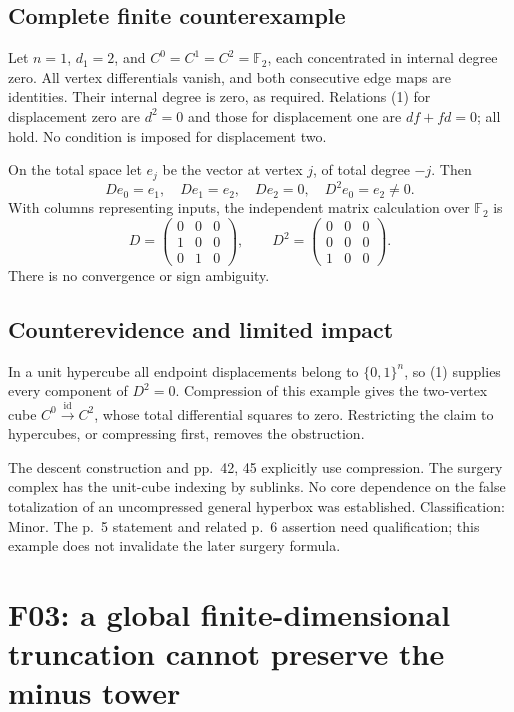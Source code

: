 \documentclass[10pt]{article}
\begin{document}
\subsection*{Complete finite counterexample}
Let \(n=1\), \(d_1=2\), and \(C^0=C^1=C^2=\mathbb F_2\), each concentrated in internal degree zero. All vertex differentials vanish, and both consecutive edge maps are identities. Their internal degree is zero, as required. Relations (1) for displacement zero are \(d^2=0\) and those for displacement one are \(df+fd=0\); all hold. No condition is imposed for displacement two.\par
On the total space let \(e_j\) be the vector at vertex \(j\), of total degree \(-j\). Then \[De_0=e_1,\quad De_1=e_2,\quad De_2=0,\quad D^2e_0=e_2\ne0.\] With columns representing inputs, the independent matrix calculation over \(\mathbb F_2\) is \[D=\begin{pmatrix}0&0&0\\1&0&0\\0&1&0\end{pmatrix},
 \qquad
 D^2=\begin{pmatrix}0&0&0\\0&0&0\\1&0&0\end{pmatrix}.\] There is no convergence or sign ambiguity.\par
\subsection*{Counterevidence and limited impact}
In a unit hypercube all endpoint displacements belong to \(\{0,1\}^n\), so (1) supplies every component of \(D^2=0\). Compression of this example gives the two-vertex cube \(C^0\xrightarrow{\operatorname{id}}C^2\), whose total differential squares to zero. Restricting the claim to hypercubes, or compressing first, removes the obstruction.\par
The descent construction and pp. 42, 45 explicitly use compression. The surgery complex has the unit-cube indexing by sublinks. No core dependence on the false totalization of an uncompressed general hyperbox was established. Classification: Minor. The p. 5 statement and related p. 6 assertion need qualification; this example does not invalidate the later surgery formula.\par
\section*{F03: a global finite-dimensional truncation cannot preserve the minus tower}
\end{document}

